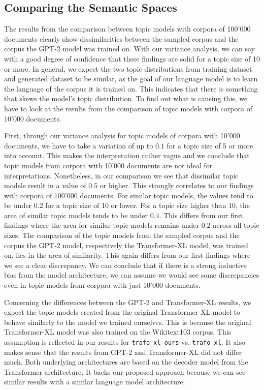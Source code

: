 \subsection{Comparing the Semantic Spaces}
The results from the comparison between topic models with corpora of 100'000 documents clearly show dissimilarities between the sampled corpus and the corpus the GPT-2 model was trained on. With our variance analysis, we can say with a good degree of confidence that these findings are solid for a topic size of 10 or more. In general, we expect the two topic distributions from training dataset and generated dataset to be similar, as the goal of our language model is to learn the language of the corpus it is trained on. This indicates that there is something that skews the model's topic distribution. To find out what is causing this, we have to look at the results from the comparison of topic models with corpora of 10'000 documents. 

First, through our variance analysis for topic models of corpora with 10'000 documents, we have to take a variation of up to $0.1$ for a topic size of 5 or more into account. This makes the interpretation rather vague and we conclude that topic models from corpora with 10'000 documents are not ideal for interpretations. Nonetheless, in our comparison we see that dissimilar topic models result in a value of $0.5$ or higher. This strongly correlates to our findings with corpora of 100'000 documents. For similar topic models, the values tend to be under $0.2$ for a topic size of 10 or lower. For a topic size higher than 10, the area of similar topic models tends to be under $0.4$. This differs from our first findings where the area for similar topic models remains under $0.2$ across all topic sizes. The comparison of the topic models from the sampled corpus and the corpus the GPT-2 model, respectively the Transformer-XL model, was trained on, lies in the area of similarity. This again differs from our first findings where we see a clear discrepancy. We can conclude that if there is a strong inductive bias from the model architecture, we can assume we would see some discrepancies even in topic models from corpora with just 10'000 documents. 

Concerning the differences between the GPT-2 and Transformer-XL results, we expect the topic models created from the original Transformer-XL model to behave similarly to the model we trained ourselves. This is because the original Transformer-XL model was also trained on the Wikitext103 corpus. This assumption is reflected in our results for \texttt{trafo\_xl\_ours} vs. \texttt{trafo\_xl}. It also makes sense that the results from GPT-2 and Transformer-XL did not differ much. Both underlying architectures are based on the decoder model from the Transformer architecture. It backs our proposed approach because we can see similar results with a similar language model architecture. 

